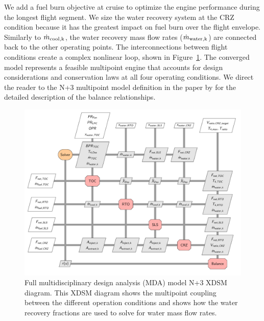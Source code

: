 \documentclass[conf]{new-aiaa}
\begin{document}
We add a fuel burn objective at cruise to optimize the engine performance during the longest flight segment.
We size the water recovery system at the CRZ condition because it has the greatest impact on fuel burn over the flight envelope.
Similarly to $\dot{m}_{\rm{cool},k}$, the water recovery mass flow rates ($\dot{m}_{\rm{water},k}$) are connected back to the other operating points.
The interconnections between flight conditions create a complex nonlinear loop, shown in Figure~\ref{fig:N3_xdsm_full}.
The converged model represents a feasible multipoint engine that accounts for design considerations and conservation laws at all four operating conditions.
We direct the reader to the N+3 multipoint model definition in the paper by \citet{Hendricks2019} for the detailed description of the balance relationships.

\begin{figure}[hbt!]
    \centering
    \includegraphics[width=\textwidth]{N3_xdsm_full.pdf}
    \caption{
        Full multidisciplinary design analysis (MDA) model N+3 XDSM diagram.
        This XDSM diagram shows the multipoint coupling between the different operation conditions and shows how the water recovery fractions are used to solve for water mass flow rates.
    }
    \label{fig:N3_xdsm_full}
\end{figure}
\end{document}
